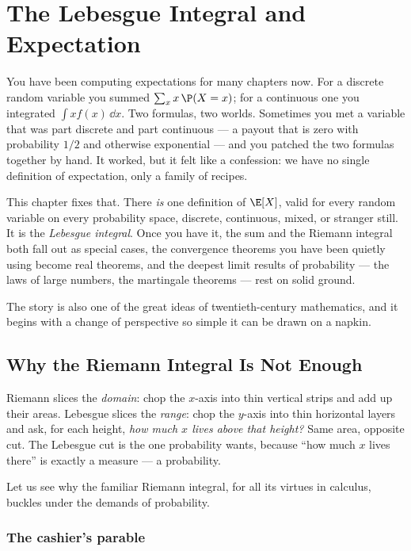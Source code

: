 \chapter{The Lebesgue Integral and Expectation}

You have been computing expectations for many chapters now. For a discrete
random variable you summed $\sum_x x\,\P(X=x)$; for a continuous one you
integrated $\int x f(x)\,\dd x$. Two formulas, two worlds. Sometimes you met a
variable that was part discrete and part continuous --- a payout that is zero
with probability $1/2$ and otherwise exponential --- and you patched the two
formulas together by hand. It worked, but it felt like a confession: we have no
single definition of expectation, only a family of recipes.

This chapter fixes that. There \emph{is} one definition of $\E[X]$, valid for
every random variable on every probability space, discrete, continuous, mixed,
or stranger still. It is the \emph{Lebesgue integral}. Once you have it, the sum
and the Riemann integral both fall out as special cases, the convergence
theorems you have been quietly using become real theorems, and the deepest
limit results of probability --- the laws of large numbers, the martingale
theorems --- rest on solid ground.

The story is also one of the great ideas of twentieth-century mathematics, and
it begins with a change of perspective so simple it can be drawn on a napkin.

\section{Why the Riemann Integral Is Not Enough}
\label{ch37:why-lebesgue}

\begin{intuitionbox}
Riemann slices the \emph{domain}: chop the $x$-axis into thin vertical strips
and add up their areas. Lebesgue slices the \emph{range}: chop the $y$-axis into
thin horizontal layers and ask, for each height, \emph{how much $x$ lives above
that height?} Same area, opposite cut. The Lebesgue cut is the one probability
wants, because ``how much $x$ lives there'' is exactly a measure --- a
probability.
\end{intuitionbox}

Let us see why the familiar Riemann integral, for all its virtues in calculus,
buckles under the demands of probability.

\subsection{The cashier's parable}

